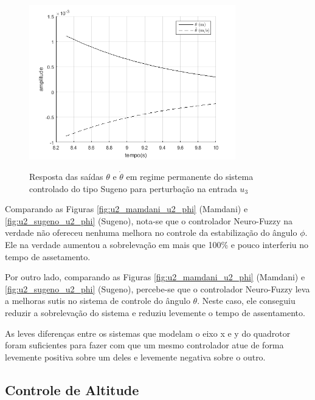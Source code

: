 \begin{figure}[!htb]
    \centering
    \caption{Resposta das saídas $\theta$ e $\dot{\theta}$ em regime permanente do sistema controlado do tipo Sugeno para perturbação na entrada $u_3$}
    \includegraphics[width=0.8\textwidth]{./04-figuras/resultados/fis_u3/u3_mamdani_u3_theta_regime_permanente}
    \label{fig:u3_sugeno_u3_theta_regime_permanente}
\end{figure}

Comparando as Figuras \ref{fig:u2_mamdani_u2_phi} (Mamdani) e \ref{fig:u2_sugeno_u2_phi} (Sugeno), nota-se que o controlador Neuro-Fuzzy na verdade não ofereceu nenhuma melhora no controle da estabilização do ângulo $\phi$. Ele na verdade aumentou a sobrelevação em mais que 100\% e pouco interferiu no tempo de assetamento.

Por outro lado, comparando as Figuras \ref{fig:u2_mamdani_u2_phi} (Mamdani) e \ref{fig:u2_sugeno_u2_phi} (Sugeno), percebe-se que o controlador Neuro-Fuzzy leva a melhoras sutis no sistema de controle do ângulo $\theta$. Neste caso, ele conseguiu reduzir a sobrelevação do sistema e reduziu levemente o tempo de assentamento.

As leves diferenças entre os sistemas que modelam o eixo x e y do quadrotor foram suficientes para fazer com que um mesmo controlador atue de forma levemente positiva sobre um deles e levemente negativa sobre o outro.

\subsection{Controle de Altitude}
\label{subsec:controle_altitude}












